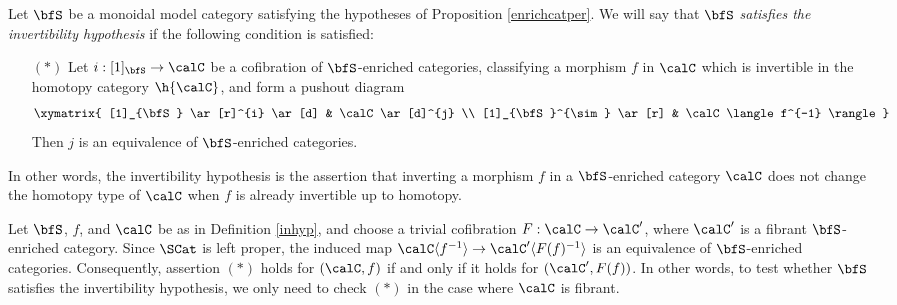 \begin{Simplicial Categories}
\begin{definition}\label{inhyp}
Let $\bfS$ be a monoidal model category satisfying the hypotheses of Proposition
\ref{enrichcatper}. We will say that
$\bfS$ {\em satisfies the invertibility hypothesis} if the following condition is satisfied:
\begin{itemize}
\item[$(\ast)$] Let $i: [1]_{\bfS} \rightarrow \calC$ be a cofibration of $\bfS$-enriched
categories, classifying a morphism $f$ in $\calC$ which is invertible in the homotopy category $\h{\calC}$, and form a pushout diagram
$$ \xymatrix{ [1]_{\bfS} \ar[r]^{i} \ar[d] & \calC \ar[d]^{j} \\
[1]_{\bfS}^{\sim} \ar[r] & \calC\langle f^{-1} \rangle }$$ Then $j$ is an equivalence of $\bfS$-enriched categories.
\end{itemize}
\end{definition}

In other words, the invertibility hypothesis is the assertion that inverting a morphism
$f$ in a $\bfS$-enriched category $\calC$ does not change the homotopy type of $\calC$ when $f$ is already invertible up to homotopy. 

\begin{remark}\label{attaboy}
Let $\bfS$, $f$, and $\calC$ be as in Definition \ref{inhyp}, and choose a trivial cofibration
$F: \calC \rightarrow \calC'$, where $\calC'$ is a fibrant $\bfS$-enriched category.
Since $\SCat$ is left proper, the induced map
$\calC \langle f^{-1} \rangle \rightarrow \calC' \langle F(f)^{-1} \rangle$
is an equivalence of $\bfS$-enriched categories. Consequently,
assertion $(\ast)$ holds for $(\calC, f)$ if and only if it holds for
$( \calC', F(f) )$. In other words, to test whether $\bfS$ satisfies the invertibility
hypothesis, we only need to check $(\ast)$ in the case where $\calC$ is fibrant.
\end{remark}


\end{Simplicial Categories}
